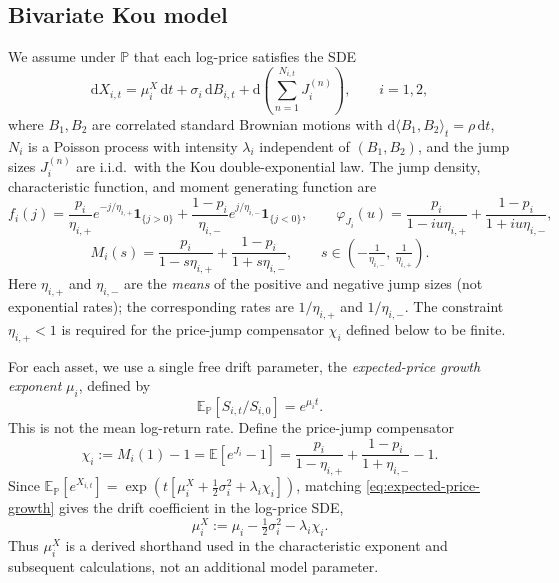 \documentclass[11pt]{article}
\newcommand{\E}{\mathbb{E}}
\renewcommand{\P}{\mathbb{P}}
\newcommand{\diff}{\mathrm{d}}
\newcommand{\one}{\mathbf{1}}
\theoremstyle{plain}
\theoremstyle{definition}
\theoremstyle{remark}
\begin{document}
\subsection{Bivariate Kou model}
We assume under $\P$ that each log-price satisfies the SDE
\begin{equation}\label{eq:log-price-sde}
\diff X_{i,t}
=
\mu_i^X\,\diff t
+
\sigma_i\,\diff B_{i,t}
+
\diff\!\left(\sum_{n=1}^{N_{i,t}} J_i^{(n)}\right),
\qquad i=1,2,
\end{equation}
where $B_1,B_2$ are correlated standard Brownian motions with $\diff\langle B_1,B_2\rangle_t=\rho\,\diff t$,
$N_i$ is a Poisson process with intensity $\lambda_i$ independent of $(B_1,B_2)$, and the jump sizes
$J_i^{(n)}$ are i.i.d.\ with the Kou double-exponential law.
The jump density, characteristic function, and moment generating function are
\begin{equation}\label{eq:Kou-char-mgf}
f_i(j)
=
\frac{p_i}{\eta_{i,+}}e^{-j/\eta_{i,+}}\one_{\{j>0\}}
+
\frac{1-p_i}{\eta_{i,-}}e^{j/\eta_{i,-}}\one_{\{j<0\}},
\qquad
\varphi_{J_i}(u)
=
\frac{p_i}{1-iu\eta_{i,+}}
+
\frac{1-p_i}{1+iu\eta_{i,-}},
\end{equation}
\begin{equation}\label{eq:MGF}
M_i(s)
=
\frac{p_i}{1-s\eta_{i,+}}
+
\frac{1-p_i}{1+s\eta_{i,-}},
\qquad
s\in\left(-\tfrac{1}{\eta_{i,-}},\,\tfrac{1}{\eta_{i,+}}\right).
\end{equation}
Here $\eta_{i,+}$ and $\eta_{i,-}$ are the \emph{means} of the positive and negative jump sizes
(not exponential rates); the corresponding rates are $1/\eta_{i,+}$ and $1/\eta_{i,-}$.
The constraint $\eta_{i,+}<1$ is required for the price-jump compensator $\chi_i$ defined below to be finite.

For each asset, we use a single free drift parameter, the \emph{expected-price growth exponent}
$\mu_i$, defined by
\begin{equation}\label{eq:expected-price-growth}
\E_\P[S_{i,t}/S_{i,0}]=e^{\mu_i t}.
\end{equation}
This is not the mean log-return rate. Define the price-jump compensator
\begin{equation}\label{eq:chi}
\chi_i
:=
M_i(1)-1
=
\E[e^{J_i}-1]
=
\frac{p_i}{1-\eta_{i,+}}+\frac{1-p_i}{1+\eta_{i,-}}-1.
\end{equation}
Since $\E_\P[e^{X_{i,t}}]=\exp(t[\mu_i^X+\tfrac12\sigma_i^2+\lambda_i\chi_i])$,
matching \eqref{eq:expected-price-growth} gives the drift coefficient in the log-price SDE,
\begin{equation}\label{eq:muX-drift}
\mu_i^X := \mu_i - \tfrac12\sigma_i^2 - \lambda_i\chi_i.
\end{equation}
Thus $\mu_i^X$ is a derived shorthand used in the characteristic exponent and subsequent
calculations, not an additional model parameter.
\end{document}
